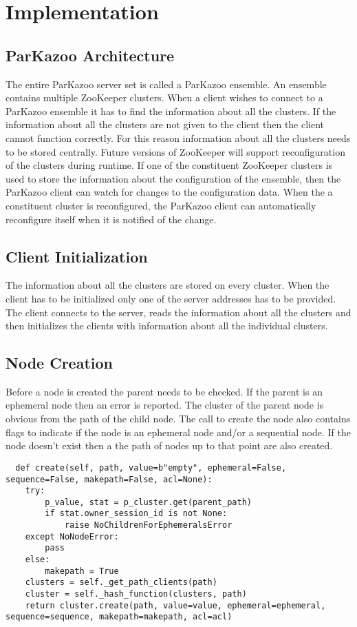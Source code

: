 \chapter{Implementation}

\section{ParKazoo Architecture}
  The entire ParKazoo server set is called a ParKazoo ensemble. An ensemble contains multiple ZooKeeper clusters. When a client wishes to connect to a ParKazoo ensemble it has to find the information about all the clusters. If the information about all the clusters are not given to the client then the client cannot function correctly. For this reason information about all the clusters needs to be stored centrally. Future versions of ZooKeeper will support reconfiguration of the clusters during runtime. If one of the constituent ZooKeeper clusters is used to store the information about the configuration of the ensemble, then the ParKazoo client can watch for changes to the configuration data. When the a constituent cluster is reconfigured, the ParKazoo client can automatically reconfigure itself when it is notified of the change. 


  
\section{Client Initialization}
    The information about all the clusters are stored on every cluster. When the client has to be initialized only one of the server addresses has to be provided. The client connects to the server, reads the information about all the clusters and then initializes the clients with information about all the individual clusters.

\section{Node Creation}
Before a node is created the parent needs to be checked. If the parent is an ephemeral node then an error is reported. The cluster of the parent node is obvious from the path of the child node. The call to create the node also contains flags to indicate if the node is an ephemeral node and/or a sequential node. If the node doesn't exist then a the path of nodes up to that point are also created.

\begin{lstlisting}
  def create(self, path, value=b"empty", ephemeral=False, sequence=False, makepath=False, acl=None):
    try:
        p_value, stat = p_cluster.get(parent_path)
        if stat.owner_session_id is not None:
            raise NoChildrenForEphemeralsError
    except NoNodeError:
        pass
    else:
        makepath = True
    clusters = self._get_path_clients(path)
    cluster = self._hash_function(clusters, path)
    return cluster.create(path, value=value, ephemeral=ephemeral, sequence=sequence, makepath=makepath, acl=acl)
\end{lstlisting}

